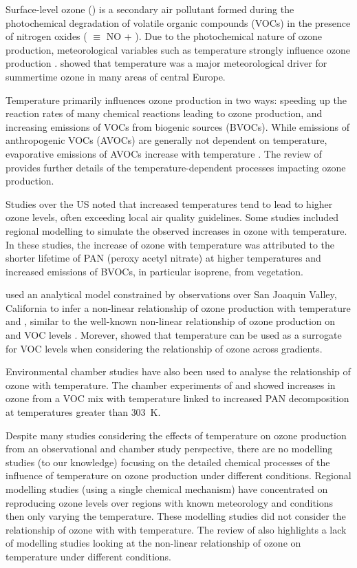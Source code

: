 Surface-level ozone () is a secondary air pollutant formed during the photochemical degradation of volatile organic compounds (VOCs) in the presence of nitrogen oxides ( $\equiv$ NO + ).
Due to the photochemical nature of ozone production, meteorological variables such as temperature strongly influence ozone production \citep{Jacob:2009}.
\citet{Otero:2016} showed that temperature was a major meteorological driver for summertime ozone in many areas of central Europe.

Temperature primarily influences ozone production in two ways: speeding up the reaction rates of many chemical reactions leading to ozone production, and increasing emissions of VOCs from biogenic sources (BVOCs).
While emissions of anthropogenic VOCs (AVOCs) are generally not dependent on temperature, evaporative emissions of AVOCs increase with temperature \citep{Rubin:2006}.
The review of \citet{Pusede:2015} provides further details of the temperature-dependent processes impacting ozone production.

Studies over the US \citep{Sillman:1995a, Dawson:2007, Pusede:2014} noted that increased temperatures tend to lead to higher ozone levels, often exceeding local air quality guidelines.
Some studies \citep{Sillman:1995a, Dawson:2007} included regional modelling to simulate the observed increases in ozone with temperature.
In these studies, the increase of ozone with temperature was attributed to the shorter lifetime of PAN (peroxy acetyl nitrate) at higher temperatures and increased emissions of BVOCs, in particular isoprene, from vegetation.

\citet{Pusede:2014} used an analytical model constrained by observations over San Joaquin Valley, California to infer a non-linear relationship of ozone production with temperature and , similar to the well-known non-linear relationship of ozone production on  and VOC levels \citep{Sillman:1999}.
Morever, \citet{Pusede:2014} showed that temperature can be used as a surrogate for VOC levels when considering the relationship of ozone across  gradients.

Environmental chamber studies have also been used to analyse the relationship of ozone with temperature.
The chamber experiments of \citet{Carter:1979} and \citet{Hatakeyama:1991} showed increases in ozone from a VOC mix with temperature linked to increased PAN decomposition at temperatures greater than $303$~K.

Despite many studies considering the effects of temperature on ozone production from an observational and chamber study perspective, there are no modelling studies (to our knowledge) focusing on the detailed chemical processes of the influence of temperature on ozone production under different  conditions.
Regional modelling studies (using a single chemical mechanism) have concentrated on reproducing ozone levels over regions with known meteorology and  conditions then only varying the temperature.
These modelling studies did not consider the relationship of ozone with  with temperature.
The review of \citet{Pusede:2015} also highlights a lack of modelling studies looking at the non-linear relationship of ozone on temperature under different  conditions.

